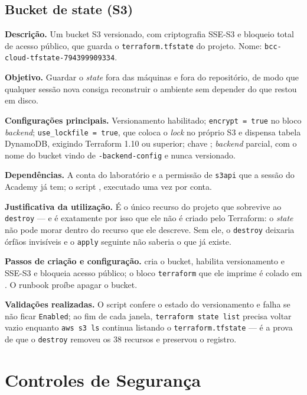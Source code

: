 \documentclass[11pt,a4paper]{article}
\begin{document}
\subsection{Bucket de state (S3)}

\textbf{Descrição.} Um bucket S3 versionado, com criptografia SSE-S3 e bloqueio total de acesso
público, que guarda o \texttt{terraform.tfstate} do projeto. Nome:
\texttt{bcc-cloud-tfstate-794399909334}.

\textbf{Objetivo.} Guardar o \emph{state} fora das máquinas e fora do repositório, de modo que
qualquer sessão nova consiga reconstruir o ambiente sem depender do que restou em disco.

\textbf{Configurações principais.} Versionamento habilitado; \texttt{encrypt = true} no bloco
\emph{backend}; \texttt{use\_\allowbreak{}lockfile = true}, que coloca o \emph{lock} no próprio S3 e dispensa
tabela DynamoDB, exigindo Terraform 1.10 ou superior; chave
; \emph{backend} parcial, com o nome do bucket vindo de
\texttt{-backend-config} e nunca versionado.

\textbf{Dependências.} A conta do laboratório e a permissão de \texttt{s3api} que a sessão do
Academy já tem; o script , executado uma vez por conta.

\textbf{Justificativa da utilização.} É o único recurso do projeto que sobrevive ao \texttt{destroy}
--- e é exatamente por isso que ele não é criado pelo Terraform: o \emph{state} não pode morar dentro
do recurso que ele descreve. Sem ele, o \texttt{destroy} deixaria órfãos invisíveis e o
\texttt{apply} seguinte não saberia o que já existe.

\textbf{Passos de criação e configuração.}  cria o bucket,
habilita versionamento e SSE-S3 e bloqueia acesso público; o bloco \texttt{terraform} que ele imprime
é colado em . O runbook proíbe apagar o bucket.

\textbf{Validações realizadas.} O script confere o estado do versionamento e falha se não ficar
\texttt{Enabled}; ao fim de cada janela, \texttt{terraform state list} precisa voltar vazio enquanto
\texttt{aws s3 ls} continua listando o \texttt{terraform.tfstate} --- é a prova de que o
\texttt{destroy} removeu os 38 recursos e preservou o registro.

\section{Controles de Segurança}
\end{document}
